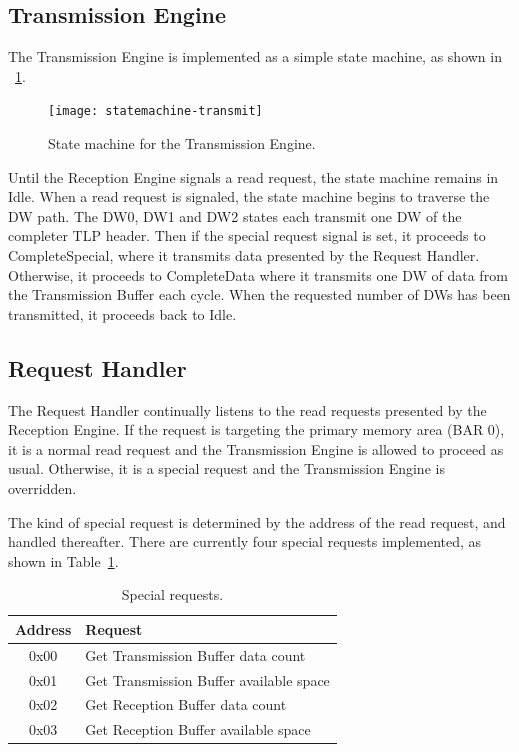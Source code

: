 \subsection{Transmission Engine}

The Transmission Engine is implemented as a simple state machine, as shown in \figurename~\ref{fig:statemachine-transmit}.

\begin{figure}[!ht]
    \centering
    \texttt{[image: statemachine-transmit]}
    \caption[Transmission Engine state machine]{
        State machine for the Transmission Engine.
    }
    \label{fig:statemachine-transmit}
\end{figure}

Until the Reception Engine signals a read request, the state machine remains in Idle.
When a read request is signaled, the state machine begins to traverse the DW path.
The DW0, DW1 and DW2 states each transmit one DW of the completer TLP header.
Then if the special request signal is set, it proceeds to CompleteSpecial, where it transmits data presented by the Request Handler.
Otherwise, it proceeds to CompleteData where it transmits one DW of data from the Transmission Buffer each cycle.
When the requested number of DWs has been transmitted, it proceeds back to Idle.

\subsection{Request Handler}

The Request Handler continually listens to the read requests presented by the Reception Engine.
If the request is targeting the primary memory area (BAR 0), it is a normal read request and the Transmission Engine is allowed to proceed as usual.
Otherwise, it is a special request and the Transmission Engine is overridden.

The kind of special request is determined by the address of the read request, and handled thereafter.
There are currently four special requests implemented, as shown in Table~\ref{tab:requests}.

\begin{table}[!ht]
    \renewcommand{\arraystretch}{1.3}
    \centering
    \begin{tabular}{c|l}
        \bfseries Address & \bfseries Request \\
        \hline
        0x00 & Get Transmission Buffer data count \\
        0x01 & Get Transmission Buffer available space \\
        0x02 & Get Reception Buffer data count \\
        0x03 & Get Reception Buffer available space \\
    \end{tabular}
    \caption[Special requests]{
        Special requests.
    }
    \label{tab:requests}
\end{table}

